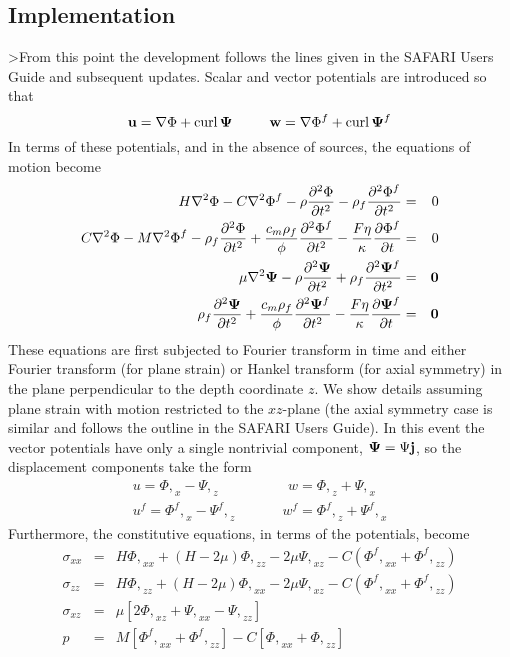 \subsection*{Implementation}

>From this point the development follows the lines given in the SAFARI
Users Guide\cite{hs:saf} and subsequent updates.  Scalar and
vector potentials are introduced so that
\[
{\bf u} = \nabla \Phi + {\rm curl}\,{\bf\Psi}~~~~~~~~
{\bf w} = \nabla \Phi^f + {\rm curl}\,{\bf\Psi}^f
\]
In terms of these potentials, and in the absence of sources, the
equations of motion become
\begin{eqnarray*}
H \nabla^2 \Phi - C \nabla^2 \Phi^f - \rho \frac{\partial^2
\Phi}{\partial t^2} - \rho_f \frac{\partial^2
\Phi^f}{\partial t^2} & = & 0 \\
C \nabla^2 \Phi - M \nabla^2 \Phi^f - \rho_f \frac{\partial^2
\Phi}{\partial t^2} + \frac{c_m \rho_f}{\phi} \frac{\partial^2
\Phi^f}{\partial t^2} - \frac{F \eta}{\kappa} \frac{\partial
\Phi^f}{\partial t} & = & 0 \\
\mu \nabla^2 {\bf\Psi} - \rho \frac{\partial^2 {\bf\Psi}}{\partial
t^2} + \rho_f \frac{\partial^2 {\bf\Psi}^f}{\partial t^2} & = & {\bf
0} \\
\rho_f \frac{\partial^2
{\bf\Psi}}{\partial t^2} + \frac{c_m \rho_f}{\phi} \frac{\partial^2
{\bf\Psi}^f}{\partial t^2} - \frac{F \eta}{\kappa} \frac{\partial
{\bf\Psi}^f}{\partial t} & = & {\bf 0}
\end{eqnarray*}
These equations are first subjected to Fourier transform in time and
either Fourier transform (for plane strain) or Hankel transform (for
axial symmetry) in the plane perpendicular to the depth coordinate
$z$.  We show details assuming plane strain with motion restricted to
the  $xz$-plane  (the axial symmetry case is similar and follows the
outline in the SAFARI Users Guide).  In this event the vector
potentials have only a single nontrivial component, ${\bf \Psi} =
\Psi {\bf j}$, so the displacement components take the form
\begin{eqnarray*}
u = {\Phi,}_x - {\Psi,}_z~~~ & ~~~~~~~~ & ~\, w = {\Phi,}_z +
{\Psi,}_x
\\
u^f = {\Phi^f,}_x - {\Psi^f,}_z & & w^f = {\Phi^f,}_z +
{\Psi^f,}_x
\end{eqnarray*}
Furthermore, the constitutive equations, in terms of the potentials,
become
\begin{eqnarray*}
\sigma_{xx} & = & H {\Phi,}_{xx} + ( H - 2\mu ) {\Phi,}_{zz} - 2\mu
{\Psi,}_{xz} - C ( {{\Phi^f},}_{xx} + {{\Phi^f},}_{zz} ) \\
\sigma_{zz} & = & H {\Phi,}_{zz} + ( H - 2\mu ) {\Phi,}_{xx} - 2\mu
{\Psi,}_{xz} - C ( {{\Phi^f},}_{xx} + {{\Phi^f},}_{zz} ) \\
\sigma_{xz} & = & \mu [ 2 {\Phi,}_{xz} + {\Psi,}_{xx} - {\Psi,}_{zz}
] \\
p & = & M [{{\Phi^f},}_{xx} + {{\Phi^f},}_{zz} ] - C [ {\Phi,}_{xx} +
{\Phi,}_{zz} ]
\end{eqnarray*}
